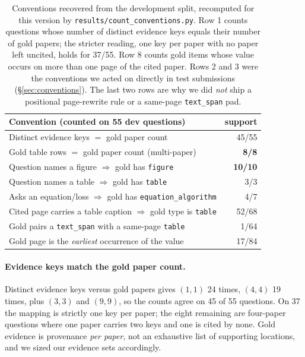 \documentclass[11pt]{article}
\newcommand{\bk}{\allowbreak}
\begin{document}
\begin{table}[t]
\centering\small
\setlength{\tabcolsep}{4pt}
\begin{tabular}{p{5.05cm}r}
\toprule
Convention (counted on 55 dev questions) & support \\
\midrule
Distinct evidence keys $=$ gold paper count        & 45/55 \\
Gold table rows $=$ gold paper count (multi-paper) & \textbf{8/8} \\
Question names a figure $\Rightarrow$ gold has \texttt{figure} & \textbf{10/10} \\
Question names a table $\Rightarrow$ gold has \texttt{table}   & 3/3 \\
Asks an equation/loss $\Rightarrow$ gold has \texttt{equation\_algorithm} & 4/7 \\
Cited page carries a table caption $\Rightarrow$ gold type is \texttt{table} & 52/68 \\
Gold pairs a \texttt{text\_span} with a same-page \texttt{table} & 1/64 \\
Gold page is the \emph{earliest} occurrence of the value & 17/84 \\
\bottomrule
\end{tabular}
\caption{Conventions recovered from the development split, recomputed for this
version by \texttt{results/\bk{}count\_\bk{}conventions.py}. Row 1 counts questions whose
number of distinct evidence keys equals their number of gold papers; the
stricter reading, one key per paper with no paper left uncited, holds for 37/55.
Row 8 counts gold items whose value occurs on more than one page of the cited
paper. Rows 2 and 3 were the conventions we acted on directly in test
submissions (\S\ref{sec:conventions}). The last two rows are why we did
\emph{not} ship a positional page-rewrite rule or a same-page
\texttt{text\_span} pad.}
\label{tab:conventions}
\end{table}

\paragraph{Evidence keys match the gold paper count.}
Distinct evidence keys versus gold papers gives $(1,1)$ 24 times, $(4,4)$ 19
times, plus $(3,3)$ and $(9,9)$, so the counts agree on 45 of 55 questions. On 37
the mapping is strictly one key per paper; the eight remaining are four-paper
questions where one paper carries two keys and one is cited by none. Gold evidence
is provenance \emph{per paper}, not an exhaustive list of supporting locations,
and we sized our evidence sets accordingly.
\end{document}
